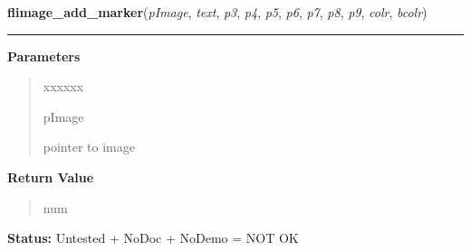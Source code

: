 \hspace{.8\funcindent}\begin{boxedminipage}{\funcwidth}

    \raggedright \textbf{flimage\_add\_marker}(\textit{pImage}, \textit{text}, \textit{p3}, \textit{p4}, \textit{p5}, \textit{p6}, \textit{p7}, \textit{p8}, \textit{p9}, \textit{colr}, \textit{bcolr})

    \vspace{-1.5ex}

    \rule{\textwidth}{0.5\fboxrule}
\setlength{\parskip}{2ex}
\setlength{\parskip}{1ex}
      \textbf{Parameters}
      \vspace{-1ex}

      \begin{quote}
        \begin{Ventry}{xxxxxx}

          \item[pImage]

          pointer to image

        \end{Ventry}

      \end{quote}

      \textbf{Return Value}
    \vspace{-1ex}

      \begin{quote}
      num

      \end{quote}

\textbf{Status:} Untested + NoDoc + NoDemo = NOT OK



    \end{boxedminipage}

    \label{xformslib:flflimage:flimage_add_marker_struct}

    \vspace{0.5ex}

